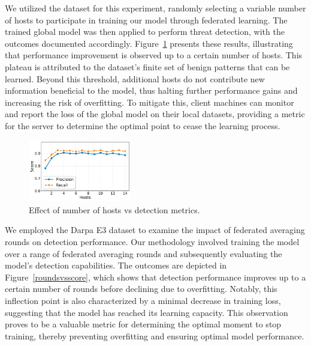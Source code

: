  We utilized the \optc dataset for this experiment, randomly selecting a variable number of hosts to participate in training our model through federated learning. The trained global model was then applied to perform threat detection, with the outcomes documented accordingly. Figure~\ref{scoresvshosts} presents these results, illustrating that performance improvement is observed up to a certain number of hosts. This plateau is attributed to the \optc dataset's finite set of benign patterns that can be learned. Beyond this threshold, additional hosts do not contribute new information beneficial to the model, thus halting further performance gains and increasing the risk of overfitting. To mitigate this, client machines can monitor and report the loss of the global model on their local datasets, providing a metric for the server to determine the optimal point to cease the learning process. \\

\begin{figure}[t!]
  \centering
  \includegraphics[width=0.4\textwidth]{fig/scoresvshosts.pdf}
  \caption{Effect of number of hosts vs detection metrics.}
  \label{scoresvshosts}
  \vspace{-2ex}
\end{figure}

 We employed the Darpa E3 dataset to examine the impact of federated averaging rounds on detection performance. Our methodology involved training the model over a range of federated averaging rounds and subsequently evaluating the model's detection capabilities. The outcomes are depicted in Figure~\ref{roundsvsscore}, which shows that detection performance improves up to a certain number of rounds before declining due to overfitting. Notably, this inflection point is also characterized by a minimal decrease in training loss, suggesting that the model has reached its learning capacity. This observation proves to be a valuable metric for determining the optimal moment to stop training, thereby preventing overfitting and ensuring optimal model performance.

